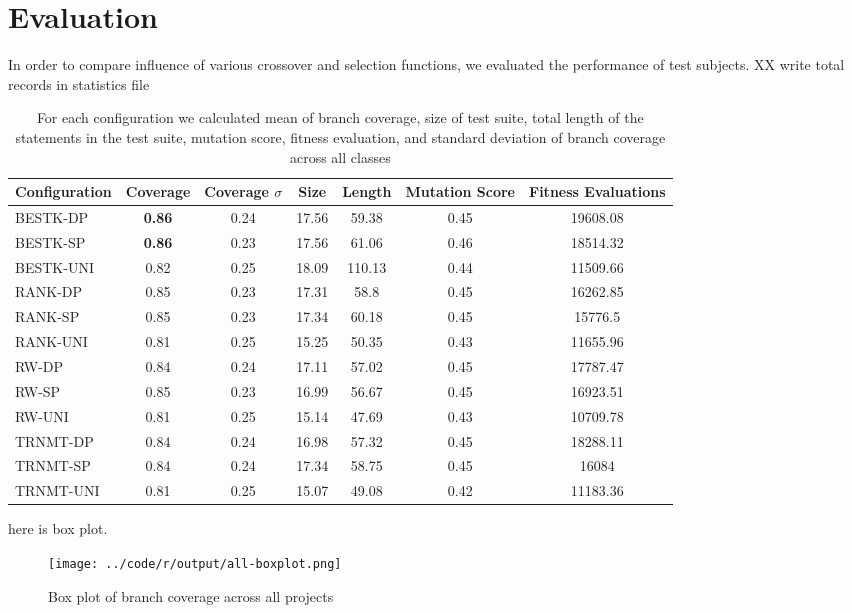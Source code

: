 \documentclass[sigconf]{acmart}
\begin{document}
\section{Evaluation}
\label{evaluation}
In order to compare influence of various crossover and selection functions, we evaluated the performance of 
test subjects. 
XX write total records in statistics file 
\begin{table*}
  \caption{For each configuration we calculated mean of branch coverage, size of test suite, 
  total length of the statements in the test suite, mutation score, fitness evaluation, 
  and standard deviation of branch coverage across all classes}
  \label{tab:allresults}
  \begin{tabular}{lcccccc}
    \toprule
    Configuration&Coverage&Coverage $\sigma$ &Size&Length&Mutation Score&Fitness Evaluations\\
    \midrule
    BESTK-DP  & \textbf{0.86} & 0.24 & 17.56 & 59.38  &0.45 & 19608.08 \\
    BESTK-SP  & \textbf{0.86} & 0.23 & 17.56 & 61.06  &0.46 & 18514.32 \\
    BESTK-UNI & 0.82          & 0.25 & 18.09 & 110.13 &0.44 & 11509.66 \\
    RANK-DP   & 0.85          & 0.23 & 17.31 & 58.8   &0.45 & 16262.85 \\
    RANK-SP   & 0.85          & 0.23 & 17.34 & 60.18  &0.45 & 15776.5  \\
    RANK-UNI  & 0.81          & 0.25 & 15.25 & 50.35  &0.43 & 11655.96 \\
    RW-DP     & 0.84          & 0.24 & 17.11 & 57.02  &0.45 & 17787.47 \\
    RW-SP     & 0.85          & 0.23 & 16.99 & 56.67  &0.45 & 16923.51 \\
    RW-UNI    & 0.81          & 0.25 & 15.14 & 47.69  &0.43 & 10709.78 \\
    TRNMT-DP  & 0.84          & 0.24 & 16.98 & 57.32  &0.45 & 18288.11 \\
    TRNMT-SP  & 0.84          & 0.24 & 17.34 & 58.75  &0.45 & 16084    \\
    TRNMT-UNI & 0.81          & 0.25 & 15.07 & 49.08  &0.42 & 11183.36 \\
    \bottomrule
  \end{tabular}
\end{table*}

here is box plot.

\begin{figure}[h]
  \centering
  \texttt{[image: ../code/r/output/all-boxplot.png]}
  \caption{Box plot of branch coverage across all projects}
\end{figure}
\end{document}
